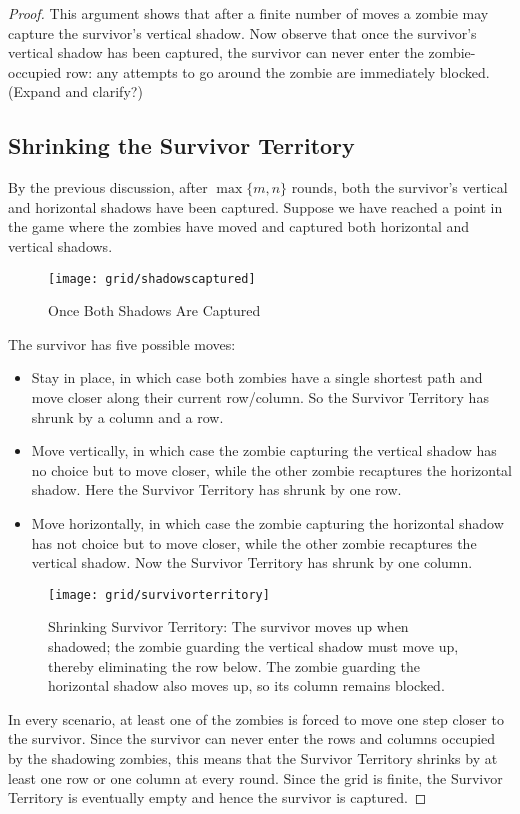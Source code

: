 \begin{proof}
This argument shows that after a finite number of moves a zombie may capture the
survivor's vertical shadow. Now observe that once the survivor's
vertical shadow has been captured, the survivor can never enter the zombie-occupied
row: any attempts to go around the zombie are immediately blocked. (Expand and clarify?)

\subsection{Shrinking the Survivor Territory}

By the previous discussion, after $\max \{ m, n \}$ rounds, both the survivor's vertical
and horizontal shadows have been captured. Suppose we have reached a point in the
game where the zombies have moved and captured both horizontal and vertical shadows.

\begin{figure}[h]
  \centering
  \texttt{[image: grid/shadowscaptured]}
  \caption{Once Both Shadows Are Captured}
\end{figure}

The survivor has five possible moves:

\begin{itemize}
  \item Stay in place, in which case both zombies have a single shortest path and
  move closer along their current row/column. So the Survivor Territory has shrunk by a column and a row.
  \item Move vertically, in which case the zombie capturing the vertical shadow
  has no choice but to move closer, while the other zombie recaptures the horizontal shadow.
  Here the Survivor Territory has shrunk by one row.
  \item Move horizontally, in which case the zombie capturing the horizontal shadow
  has not choice but to move closer, while the other zombie recaptures the vertical shadow.
  Now the Survivor Territory has shrunk by one column.
\end{itemize}

\begin{figure}[h]
  \centering
  \texttt{[image: grid/survivorterritory]}
  \caption{Shrinking Survivor Territory: The survivor moves up when shadowed; the zombie
  guarding the vertical shadow must move up, thereby eliminating the row below. The
  zombie guarding the horizontal shadow also moves up, so its column remains blocked.}
\end{figure}

In every scenario, at least one of the zombies is forced to move one
step closer to the survivor. Since the survivor can never enter the rows and columns
occupied by the shadowing zombies, this means that the Survivor Territory
 shrinks by at least one row or one column at every round.
Since the grid is finite, the Survivor Territory is eventually empty and hence
the survivor is captured.

\end{proof}

